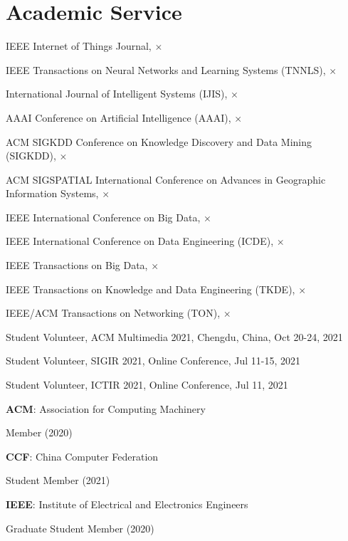\section*{Academic Service}


\indent

IEEE Internet of Things Journal, $\times$

IEEE Transactions on Neural Networks and Learning Systems (TNNLS), $\times$

International Journal of Intelligent Systems (IJIS), $\times$

AAAI Conference on Artificial Intelligence (AAAI), $\times$

ACM SIGKDD Conference on Knowledge Discovery and Data Mining (SIGKDD), $\times$

ACM SIGSPATIAL International Conference on Advances in Geographic Information Systems, $\times$

IEEE International Conference on Big Data, $\times$

IEEE International Conference on Data Engineering (ICDE), $\times$

IEEE Transactions on Big Data, $\times$

IEEE Transactions on Knowledge and Data Engineering (TKDE), $\times$

IEEE/ACM Transactions on Networking (TON), $\times$

\indent 

Student Volunteer, ACM Multimedia 2021, Chengdu, China, Oct 20-24, 2021

Student Volunteer, SIGIR 2021, Online Conference, Jul 11-15, 2021

Student Volunteer, ICTIR 2021, Online Conference, Jul 11, 2021

\indent 

\textbf{ACM}: Association for Computing Machinery 

\hspace{2em}Member (2020)

\textbf{CCF}: China Computer Federation

\hspace{2em}Student Member (2021)

\textbf{IEEE}: Institute of Electrical and Electronics Engineers

\hspace{2em}Graduate Student Member (2020)